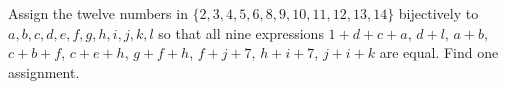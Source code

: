Assign the twelve numbers in $\{2,3,4,5,6,8,9,10,11,12,13,14\}$ bijectively to $a,b,c,d,e,f,g,h,i,j,k,l$ so that all nine expressions $1+d+c+a$, $d+l$, $a+b$, $c+b+f$, $c+e+h$, $g+f+h$, $f+j+7$, $h+i+7$, $j+i+k$ are equal. Find one assignment.
